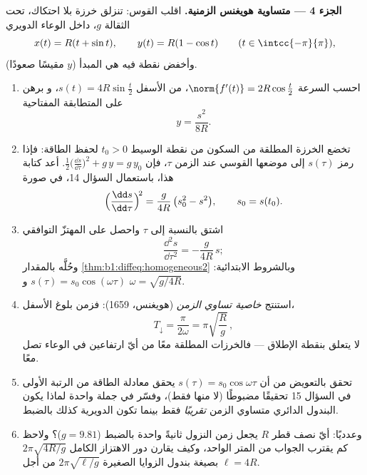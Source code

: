 \begin{problem}
\medskip
\noindent\textbf{الجزء 4 --- متساوية هويغنس الزمنية.} اقلب
القوس: تنزلق خرزة بلا احتكاك، تحت الثقالة $g$، داخل
الوعاء الدويري
\[
x(t) = R(t + \sin t), \qquad y(t) = R(1 - \cos t)
\qquad (t \in \intcc{-\pi}{\pi}),
\]
وأخفض نقطة فيه هي المبدأ ($y$ مقيسًا صعودًا).
\begin{enumerate}[resume]
  \item احسب السرعة $\norm{f'(t)} = 2R\cos\frac t2$،  من الأسفل $s(t) = 4R\sin\frac t2$، و
        برهن على المتطابقة المفتاحية
        \[
        y = \frac{s^2}{8R} .
        \]
  \item تخضع الخرزة المطلقة من السكون من نقطة الوسيط
        $t_0 > 0$ لحفظ الطاقة: فإذا رمز $s(\tau)$
        إلى موضعها القوسي عند الزمن $\tau$، فإن $\frac12\bigl(
        \frac{\dd s}{\dd\tau}\bigr)^2 + g\,y = g\,y_0$. أعد كتابة
        هذا، باستعمال السؤال 14، في صورة
        \[
        \Bigl(\frac{\dd s}{\dd\tau}\Bigr)^{\!2}
        = \frac{g}{4R}\,\bigl(s_0^2 - s^2\bigr),
        \qquad s_0 = s(t_0).
        \]
  \item اشتق بالنسبة إلى $\tau$ واحصل على المهتزّ
        التوافقي
        \[
        \frac{\dd^2 s}{\dd\tau^2} = -\frac{g}{4R}\,s ;
        \]
        وحُلَّه بالمقدار \cref{thm:b1:diffeq:homogeneous2} وبالشروط
        الابتدائية: $s(\tau) = s_0\cos(\omega\tau)$ و
        $\omega = \sqrt{g/4R}$.
  \item استنتج \emph{خاصية تساوي الزمن} (هويغنس، 1659):
        فزمن بلوغ الأسفل،
        \[
        T_{\downarrow} = \frac{\pi}{2\omega}
        = \pi\sqrt{\frac Rg}\,,
        \]
        لا يتعلق بنقطة الإطلاق --- فالخرزات المطلقة
        معًا من أيّ ارتفاعين في الوعاء تصل
        معًا.
  \item تحقق بالتعويض من أن $s(\tau) =
        s_0\cos\omega\tau$ يحقق معادلة الطاقة من الرتبة الأولى
        في السؤال 15 تحقيقًا مضبوطًا (لا 
        منها فقط)، وفسّر في جملة واحدة لماذا يكون البندول
        الدائري متساوي الزمن \emph{تقريبًا} فقط بينما
        تكون الدويرية كذلك بالضبط.
  \item وعدديًا: أيّ نصف قطر $R$ يجعل زمن النزول
        ثانيةً واحدة بالضبط ($g = 9.81$)؟ ولاحظ كم يقترب
        الجواب من المتر الواحد، وكيف يقارن دور
        الاهتزاز الكامل $2\pi\sqrt{4R/g}$ بصيغة بندول
        الزوايا الصغيرة $2\pi\sqrt{\ell/g}$ من أجل $\ell = 4R$.
\end{enumerate}


\end{problem}
